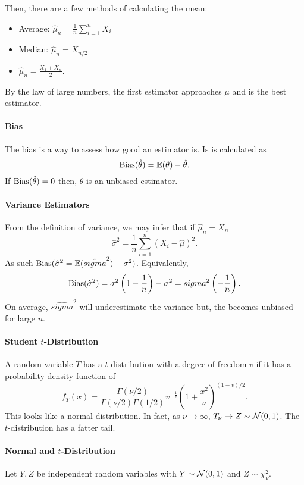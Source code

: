 Then, there are a few methods of calculating the mean:
\begin{itemize}
  \item Average: \(\hat{\mu}_n = \frac{1}{n} \sum_{i=1}^n X_i \)
  \item Median: \(\hat{\mu}_n = X_{n/2}\)
  \item  \(\hat{\mu}_n = \frac{X_1 + X_n}{2}\).
\end{itemize}
By the law of large numbers, the first estimator approaches \(\mu\) and
is the best estimator.

\paragraph{Bias}
The bias is a way to assess how good an estimator is.
Is is calculated as \[
  \mathrm{Bias}(\hat{\theta}) = \mathbb{E}(\theta) - \hat{\theta}
.\] 
If  \(\mathrm{Bias}(\hat{\theta}) = 0\) then, \(\theta\) is an unbiased estimator.

\paragraph{Variance Estimators}
From the definition of variance, we may infer that if \(\hat{\mu}_n = \overline{X}_n\) \[
  \hat{\sigma}^2 = \frac{1}{n} \sum_{i=1}^n (X_i - \hat{\mu})^2
.\] 
As such \(\mathrm{Bias}(\hat{\sigma}^2 = \mathbb{E}(\hat{sigma}^2) - \sigma^2)\). Equivalently, \[
  \mathrm{Bias}(\hat{\sigma}^2) = \sigma^2 \left( 1-\frac{1}{n} \right)  - \sigma^2
  = sigma^2\left(  - \frac{1}{n} \right) 
.\] 
On average, \(\hat{sigma}^2\) will underestimate the variance but,
the becomes unbiased for large \(n\).

\paragraph{Student \(t\)-Distribution}
A random variable \(T\) has a \(t\)-distribution with a degree
of freedom  \(v\) if it has a probability density function of \[
  f_T(x) = \frac{\Gamma(\nu/2)}{\Gamma(\nu/2)\Gamma(1/2)}
  v^{-\frac{1}{2}} \left( 1 + \frac{x^2}{\nu} \right)^{(1-v)/2}
.\] 
This looks like a normal distribution. In fact, as \(\nu \to  \infty\),
\(T_\nu \to Z \sim \mathcal{N}(0, 1)\). The \(t\)-distribution has
a fatter tail.

\paragraph{Normal and \(t\)-Distribution}
Let \(Y, Z\) be independent random variables with
\(Y \sim \mathcal{N}(0, 1)\) and \(Z \sim \chi_\nu^2\).

